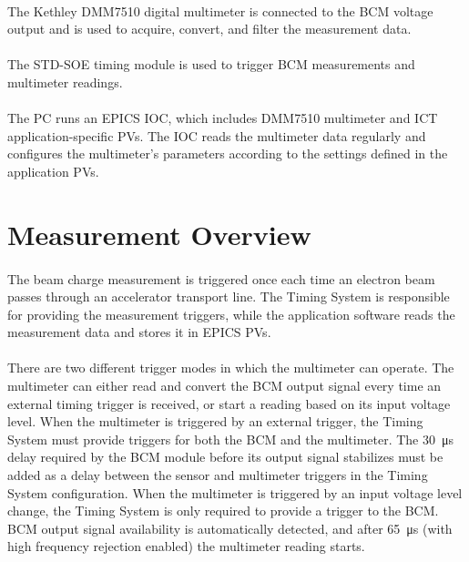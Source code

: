 \documentclass[openany]{article}
\begin{document}
	\paragraph{} The Kethley DMM7510 digital multimeter is connected to the BCM voltage output and is used to acquire, convert, and filter the measurement data.

	\paragraph{} The STD-SOE timing module is used to trigger BCM measurements and multimeter readings.

	\paragraph{} The PC runs an EPICS IOC, which includes DMM7510 multimeter and ICT application-specific PVs. The IOC reads the multimeter data regularly and configures the multimeter's parameters according to the settings defined in the application PVs.

\section{Measurement Overview}

	\paragraph{} The beam charge measurement is triggered once each time an electron beam passes through an accelerator transport line. The Timing System is responsible for providing the measurement triggers, while the application software reads the measurement data and stores it in EPICS PVs.
	\paragraph{} There are two different trigger modes in which the multimeter can operate. The multimeter can either read and convert the BCM output signal every time an external timing trigger is received, or start a reading based on its input voltage level. When the multimeter is triggered by an external trigger, the Timing System must provide triggers for both the BCM and the multimeter. The \SI{30}{\micro\second} delay required by the BCM module before its output signal stabilizes must be added as a delay between the sensor and multimeter triggers in the Timing System configuration. When the multimeter is triggered by an input voltage level change, the Timing System is only required to provide a trigger to the BCM. BCM output signal availability is automatically detected, and after \SI{65}{\micro\second} (with high frequency rejection enabled) the multimeter reading starts.
\end{document}
